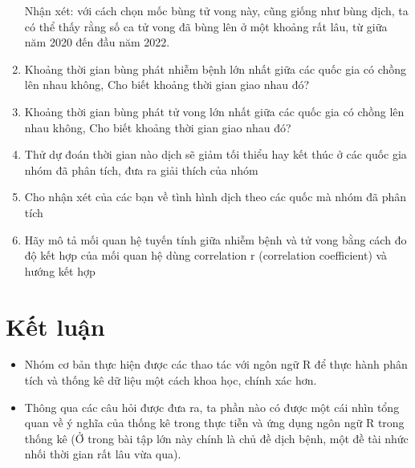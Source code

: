 \documentclass[a4paper]{article}
\theoremstyle{definition}
\begin{document}
\begin{enumerate}[1)]
Nhận xét: với cách chọn mốc bùng tử vong này, cũng giống như bùng dịch, ta có thể thấy rằng số ca tử vong đã bùng lên ở một khoảng rất lâu, từ giữa năm 2020 đến đầu năm 2022.
        \item Khoảng thời gian bùng phát nhiễm bệnh lớn nhất giữa các quốc gia có chồng lên nhau không, Cho biết khoảng thời gian giao nhau đó?
        \item Khoảng thời gian bùng phát tử vong lớn nhất giữa các quốc gia có chồng lên nhau không, Cho biết khoảng thời gian giao nhau đó?
        \item Thử dự đoán thời gian nào dịch sẽ giảm tối thiểu hay kết thúc ở các quốc gia nhóm đã phân tích, đưa ra giải thích của nhóm
        \item Cho nhận xét của các bạn về tình hình dịch theo các quốc mà nhóm đã phân tích
        \item Hãy mô tả mối quan hệ tuyến tính giữa nhiễm bệnh và tử vong bằng cách đo độ kết hợp của mối quan hệ dùng correlation r (correlation coefficient) và hướng kết hợp
    \end{enumerate}


\section{Kết luận}
\begin{itemize}
    \item Nhóm cơ bản thực hiện được các thao tác với ngôn ngữ R để thực hành phân tích và thống kê dữ liệu một cách khoa học, chính xác hơn.
    \item Thông qua các câu hỏi được đưa ra, ta phần nào có được một cái nhìn tổng quan về ý nghĩa của thống kê trong thực tiễn và ứng dụng ngôn ngữ R trong thống kê (Ở trong bài tập lớn này chính là chủ đề dịch bệnh, một đề tài nhức nhối thời gian rất lâu vừa qua).
\end{itemize}
\end{document}
